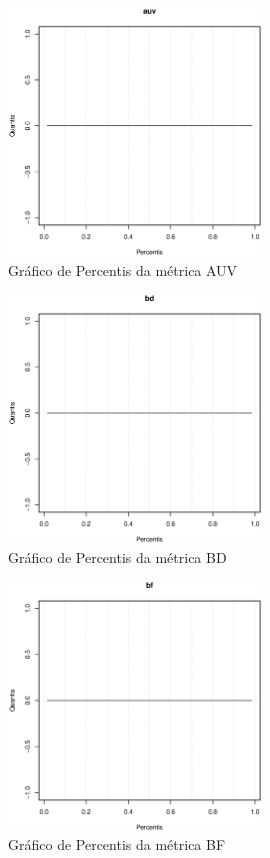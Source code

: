 \begin{apendicesenv}
\begin{figure}[h]
  \centering
  \includegraphics[width=0.6\textwidth]
      {dados/linux/auv.eps}
  \caption{Gráfico de Percentis da métrica AUV}
\end{figure}

\newpage

\begin{figure}[h]
  \centering
  \includegraphics[width=0.6\textwidth]
      {dados/linux/bd.eps}
  \caption{Gráfico de Percentis da métrica BD}
\end{figure}

\begin{figure}[h]
  \centering
  \includegraphics[width=0.6\textwidth]
      {dados/linux/bf.eps}
  \caption{Gráfico de Percentis da métrica BF}
\end{figure}


\end{apendicesenv}
